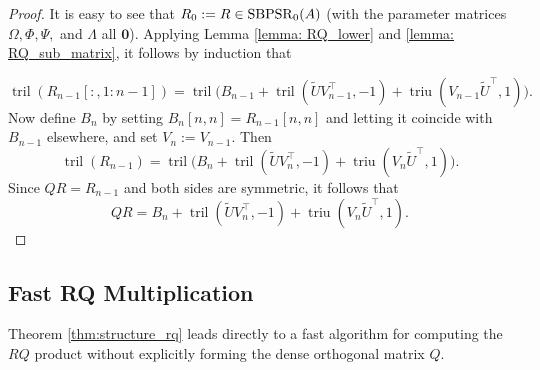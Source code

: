 \documentclass[a4paper,fleqn]{cas-sc}
\DeclareMathOperator{\triu}{triu}
\DeclareMathOperator{\tril}{tril}
\begin{document}
\begin{proof}
    It is easy to see that $R_0:=R\in {\rm SBPSR}_{0}(A)$ (with the parameter matrices $\Omega, \Phi, \Psi,$ and $\Lambda$ all $\mathbf{0}$). Applying Lemma \ref{lemma: RQ_lower} and \ref{lemma: RQ_sub_matrix}, it follows by induction that

\[
\tril(R_{n-1}[:,1:n-1]) = \tril \big(B_{n-1} + \tril(\tilde U V_{n-1}^\top,-1) + \triu(V_{n-1} \tilde U^\top,1)\big).
\]
Now define $B_n$ by setting $B_n[n,n]=R_{n-1}[n,n]$ and letting it coincide with $B_{n-1}$ elsewhere, and set $V_n:=V_{n-1}$. Then
\[
\tril(R_{n-1}) = \tril \big(B_{n} + \tril(\tilde U V_n^\top,-1) + \triu(V_n \tilde U^\top,1)\big).
\]  
Since $QR=R_{n-1}$ and both sides are symmetric, it follows that
\[
QR = B_n + \tril(\tilde U V_n^\top,-1) + \triu(V_n \tilde U^\top,1).
\]
\end{proof}



\subsection{Fast RQ Multiplication}

Theorem \ref{thm:structure_rq} leads directly to a fast algorithm for computing the $RQ$ product without explicitly forming the dense orthogonal matrix $Q$.
\end{document}
